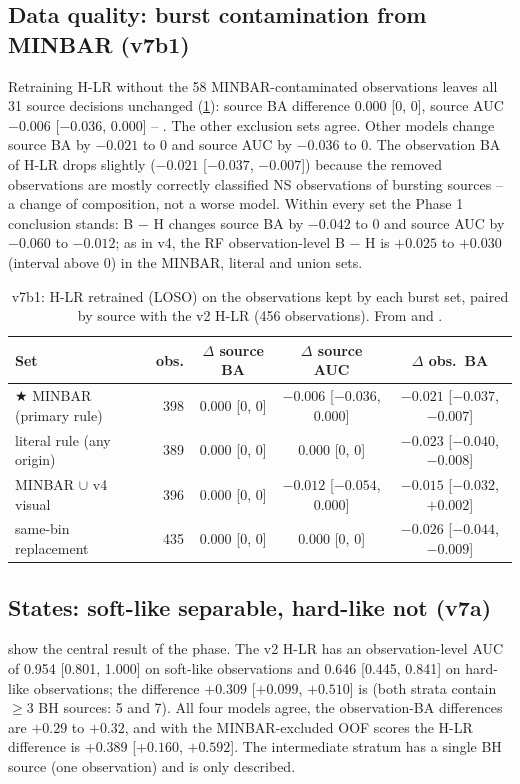\subsection{Data quality: burst contamination from MINBAR (v7b1)}\label{sec:p4minbar}
\Primary{} Retraining H-LR without the 58 MINBAR-contaminated observations leaves all 31 source decisions unchanged
(\cref{tab:p4minbar}): source BA difference $0.000$ [0, 0], source AUC $-0.006$ [$-0.036$, 0.000] -- \NotDetected. The
other exclusion sets agree. Other models change source BA by $-0.021$ to 0 and source AUC by $-0.036$ to 0. The
observation BA of H-LR drops slightly ($-0.021$ [$-0.037$, $-0.007$]) because the removed observations are mostly correctly
classified NS observations of bursting sources -- a change of composition, not a worse model. Within every set the
Phase 1 conclusion stands: B $-$ H changes source BA by $-0.042$ to 0 and source AUC by $-0.060$ to $-0.012$; as in v4, the
RF observation-level B $-$ H is $+0.025$ to $+0.030$ (interval above 0) in the MINBAR, literal and union sets.

\begin{table}[htbp]
\centering\small
\caption[MINBAR exclusion]{\Primary{} v7b1: H-LR retrained (LOSO) on the observations kept by each burst set, paired by
source with the v2 H-LR (456 observations). From  and
.}
\label{tab:p4minbar}
\setlength{\tabcolsep}{4pt}
\begin{tabular}{@{}lrccc@{}}
\toprule
Set & obs. & $\Delta$ source BA & $\Delta$ source AUC & $\Delta$ obs.\ BA \\
\midrule
$\bigstar$ MINBAR (primary rule) & 398 & $0.000$ [0, 0] & $-0.006$ [$-0.036$, 0.000] & $-0.021$ [$-0.037$, $-0.007$] \\
literal rule (any origin) & 389 & $0.000$ [0, 0] & $0.000$ [0, 0] & $-0.023$ [$-0.040$, $-0.008$] \\
MINBAR $\cup$ v4 visual & 396 & $0.000$ [0, 0] & $-0.012$ [$-0.054$, 0.000] & $-0.015$ [$-0.032$, $+0.002$] \\
same-bin replacement & 435 & $0.000$ [0, 0] & $0.000$ [0, 0] & $-0.026$ [$-0.044$, $-0.009$] \\
\bottomrule
\end{tabular}
\end{table}

\subsection{States: soft-like separable, hard-like not (v7a)}\label{sec:p4v7a}
\Primary{}  show the central result of the phase. The v2 H-LR has an observation-level AUC
of 0.954 [0.801, 1.000] on soft-like observations and 0.646 [0.445, 0.841] on hard-like observations; the difference
$+0.309$ [$+0.099$, $+0.510$] is \Detected{} (both strata contain $\ge3$ BH sources: 5 and 7). All four models agree, the
observation-BA differences are $+0.29$ to $+0.32$, and with the MINBAR-excluded OOF scores the H-LR difference is $+0.389$
[$+0.160$, $+0.592$]. The intermediate stratum has a single BH source (one observation) and is only described.

